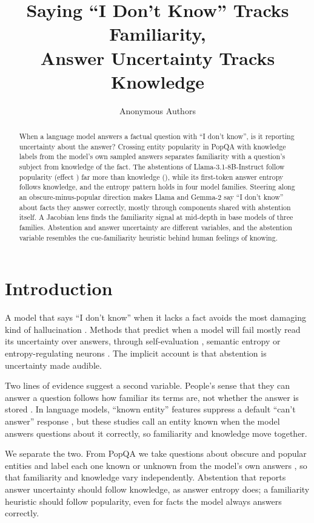 \documentclass{article}
\title{Saying ``I Don't Know'' Tracks Familiarity,\\Answer Uncertainty Tracks Knowledge}
\author{Anonymous Authors}
\newcommand{\idk}{``I don't know''}
\begin{document}
\maketitle

\begin{abstract}
When a language model answers a factual question with \idk, is it reporting uncertainty about the answer? Crossing entity popularity in PopQA with knowledge labels from the model's own sampled answers separates familiarity with a question's subject from knowledge of the fact. The abstentions of Llama-3.1-8B-Instruct follow popularity (effect \hmLlamaPopEff) far more than knowledge (\hmLlamaKnowEff), while its first-token answer entropy follows knowledge, and the entropy pattern holds in four model families. Steering along an obscure-minus-popular direction makes Llama and Gemma-2 say \idk{} about facts they answer correctly, mostly through components shared with abstention itself. A Jacobian lens finds the familiarity signal at mid-depth in base models of three families. Abstention and answer uncertainty are different variables, and the abstention variable resembles the cue-familiarity heuristic behind human feelings of knowing.
\end{abstract}

\section{Introduction}

A model that says \idk{} when it lacks a fact avoids the most damaging kind of hallucination \citep{kalai2025hallucinate}. Methods that predict when a model will fail mostly read its uncertainty over answers, through self-evaluation \citep{kadavath2022know}, semantic entropy \citep{kuhn2023semantic} or entropy-regulating neurons \citep{stolfo2024confidence}. The implicit account is that abstention is uncertainty made audible.

Two lines of evidence suggest a second variable. People's sense that they can answer a question follows how familiar its terms are, not whether the answer is stored \citep{reder1992,schwartz1992}. In language models, ``known entity'' features suppress a default ``can't answer'' response \citep{ferrando2025iknow,lindsey2025biology}, but these studies call an entity known when the model answers questions about it correctly, so familiarity and knowledge move together.

We separate the two. From PopQA \citep{mallen2023popqa} we take questions about obscure and popular entities and label each one known or unknown from the model's own answers \citep{gekhman2024slick}, so that familiarity and knowledge vary independently. Abstention that reports answer uncertainty should follow knowledge, as answer entropy does; a familiarity heuristic should follow popularity, even for facts the model always answers correctly.
\end{document}
